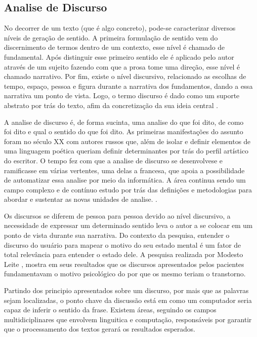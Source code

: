 \subsection{Analise de Discurso}
No decorrer de um texto (que é algo concreto), pode-se caracterizar diversos níveis de geração de sentido.
A primeira formulação de sentido vem do discernimento de termos dentro de um contexto, esse nível é chamado de fundamental. Após distinguir esse primeiro sentido ele é aplicado pelo autor através de um sujeito fazendo com que a prosa tome uma direção, esse nível é chamado narrativo. Por fim, existe o nível discursivo, relacionado as escolhas de tempo, espaço, pessoa e figura durante a narrativa dos fundamentos, dando a essa narrativa um ponto de vista. Logo, o termo discurso é dado como um suporte abstrato por trás do texto, afim da concretização da sua ideia central \cite[13-17]{gregolin1995ad}.

A analise de discurso é, de forma sucinta, uma analise do que foi dito, de como foi dito e qual o sentido do que foi dito. As primeiras manifestações do assunto foram no século XX com autores russos que, além de isolar e definir elementos de uma linguagem poética queriam definir determinantes por trás do perfil artístico do escritor. O tempo fez com que a analise de discurso se desenvolvese e ramificasse em várias vertentes, uma delas a francesa, que apoia a possibilidade de automatizar essa analise por meio da informática. A área continua sendo um campo complexo e de contínuo estudo por trás das definições e metodologias para abordar e sustentar as novas unidades de analise. \cite[22]{souza2006ad}.

Os discursos se diferem de pessoa para pessoa devido ao nível discursivo, a necessidade de expressar um determinado sentido leva o autor a se colocar em um ponto de vista durante sua narrativa. Do contexto da pesquisa, entender o discurso do usuário para mapear o motivo do seu estado mental é um fator de total relevância para entender o estado dele. A pesquisa realizada por Modesto Leite \cite[134]{modesto2005adepre}, mostra em seus resultados que os discursos apresentados pelos pacientes fundamentavam o motivo psicológico do por que os mesmo teriam o transtorno. 

Partindo dos principio apresentados sobre um discurso, por mais que as palavras sejam localizadas, o ponto chave da discussão está em como um computador seria capaz de inferir o sentido da frase. Existem áreas, seguindo os campos multidiciplinares que envolvem linguitica e computação, responsáveis por garantir que o processamento dos textos gerará os resultados esperados.
